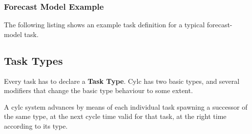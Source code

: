 \documentclass[11pt,a4paper]{article}
\begin{document}
{

}

\subsubsection{Forecast Model Example}

The following listing shows an example task definition for a
typical forecast-model task.

\lstset{language=cylctaskdef}

{

}


\subsection{Task Types} 

Every task has to declare a {\bf Task Type}. Cylc has two basic types,
and several modifiers that change the basic type behaviour to some
extent.  

A cylc system advances by means of each individual task spawning a 
successor of the same type, at the next cycle time valid for that task,
at the right time according to its type.
\end{document}
